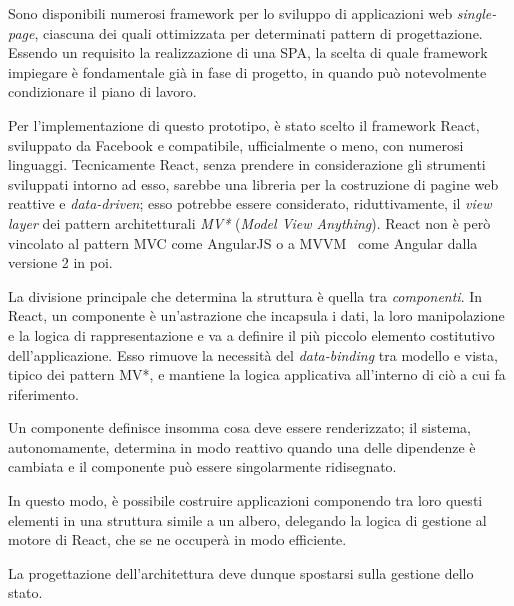      Sono disponibili numerosi framework per lo sviluppo di applicazioni web \emph{single-page}, ciascuna dei quali ottimizzata per determinati pattern di progettazione.
      Essendo un requisito la realizzazione di una SPA, la scelta di quale framework impiegare è fondamentale già in fase di progetto, in quando può notevolmente condizionare il piano di lavoro.

      Per l'implementazione di questo prototipo, è stato scelto il framework React, sviluppato da Facebook e compatibile, ufficialmente o meno, con numerosi linguaggi.
      Tecnicamente React, senza prendere in considerazione gli strumenti sviluppati intorno ad esso, sarebbe una libreria per la costruzione di pagine web reattive e \emph{data-driven};
      esso potrebbe essere considerato, riduttivamente, il \emph{view layer} dei pattern architetturali \emph{MV*} (\emph{Model View Anything}).
      React non è però vincolato al pattern MVC come AngularJS o a MVVM~\cite{Anderson2012} come Angular dalla versione 2 in poi.


      La divisione principale che determina la struttura è quella tra \emph{componenti}.
      In React, un componente è un'astrazione che incapsula i dati, la loro manipolazione e la logica di rappresentazione e va a definire il più piccolo elemento costitutivo dell'applicazione.
      Esso rimuove la necessità del \emph{data-binding} tra modello e vista, tipico dei pattern MV*, e mantiene la logica applicativa all'interno di ciò a cui fa riferimento.

      Un componente definisce insomma cosa deve essere renderizzato;
      il sistema, autonomamente, determina in modo reattivo quando una delle dipendenze è cambiata e il componente può essere singolarmente ridisegnato.

      In questo modo, è possibile costruire applicazioni componendo tra loro questi elementi in una struttura simile a un albero, delegando la logica di gestione al motore di React, che se ne occuperà in modo efficiente.

      La progettazione dell'architettura deve dunque spostarsi sulla gestione dello stato.


